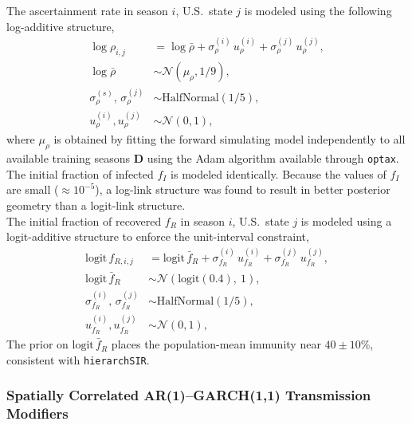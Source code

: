 \documentclass[11pt]{article}
\newcommand{\Normal}{\mathcal{N}}
\newcommand{\HalfNormal}{\text{HalfNormal}}
\begin{document}
The ascertainment rate in season $i$, U.S.\ state $j$ is modeled using the following log-additive structure,
\begin{align}
	 \log \rho_{i,j} &= \log \bar{\rho} + \sigma^{(i)}_\rho\, u^{(i)}_{\rho} + \sigma^{(j)}_\rho\, u^{(j)}_{\rho}, \nonumber\\
    \log \bar{\rho} &\sim \Normal\!\left(\mu_{\rho},1/9\right), \nonumber\\
    \sigma^{(s)}_\rho,\, \sigma^{(j)}_\rho &\sim \HalfNormal\! \left( 1/5 \right), \nonumber\\
    u^{(i)}_{\rho}, u^{(j)}_{\rho} &\sim \Normal(0,1),
\end{align}
where $\mu_\rho$ is obtained by fitting the forward simulating model independently to all available training seasons $\bm{D}$ using the Adam algorithm available through \texttt{optax}. The initial fraction of infected $f_I$ is modeled identically. Because the values of $f_I$ are small ($\approx 10^{-5}$), a log-link structure was found to result in better posterior geometry than a logit-link structure.\\

The initial fraction of recovered $f_R$ in season $i$, U.S.\ state $j$ is modeled using a logit-additive structure to enforce the unit-interval constraint,
\begin{align}
	\text{logit}\,f_{R,i,j} &= \text{logit}\,\bar{f}_R + \sigma^{(i)}_{f_R}\, u^{(i)}_{f_R} + \sigma^{(j)}_{f_R}\, u^{(j)}_{f_R}, \nonumber\\
    \text{logit}\,\bar{f}_R &\sim \Normal\!\left(\text{logit}(0.4),\ 1\right), \nonumber\\
    \sigma^{(i)}_{f_R},\, \sigma^{(j)}_{f_R} &\sim \HalfNormal\!\left(1/5\right), \nonumber\\
    u^{(i)}_{f_R}, u^{(j)}_{f_R} &\sim \Normal(0,1),
\end{align}
The prior on $\text{logit}\,\bar{f}_R$ places the population-mean immunity near $40\pm10\%$, consistent with \texttt{hierarchSIR}.

\subsubsection*{Spatially Correlated AR(1)--GARCH(1,1) Transmission Modifiers}\label{sec:argarch}
\end{document}
